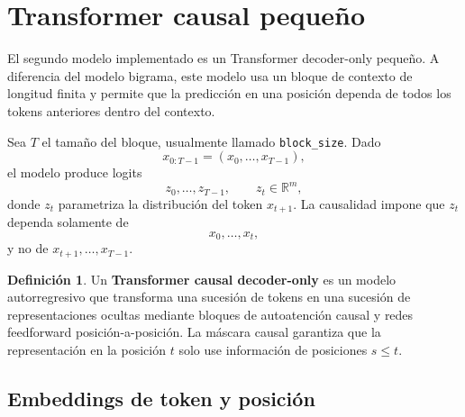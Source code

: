 \documentclass[11pt]{report}
\newenvironment{tcolorbox}[1][]{\par\medskip\noindent\ignorespaces}{\par\medskip}
\theoremstyle{definition}
\newtheorem{definicion}{Definición}[section]
\theoremstyle{plain}
\numberwithin{equation}{section}
\begin{document}
\section{Transformer causal pequeño}

El segundo modelo implementado es un Transformer decoder-only pequeño. A diferencia del modelo bigrama, este modelo usa un bloque de contexto de longitud finita y permite que la predicción en una posición dependa de todos los tokens anteriores dentro del contexto.

Sea \(T\) el tamaño del bloque, usualmente llamado \texttt{block\_size}. Dado
\begin{equation*}
    x_{0:T-1}
    =
    (x_0,\ldots,x_{T-1}),
\end{equation*}
el modelo produce logits
\begin{equation*}
    z_0,\ldots,z_{T-1},
    \qquad
    z_t\in\mathbb{R}^m,
\end{equation*}
donde \(z_t\) parametriza la distribución del token \(x_{t+1}\). La causalidad impone que \(z_t\) dependa solamente de
\begin{equation*}
    x_0,\ldots,x_t,
\end{equation*}
y no de \(x_{t+1},\ldots,x_{T-1}\).

\begin{tcolorbox}[colback=blue!8, colframe=blue!8, boxrule=0pt]
\begin{definicion}
Un \textbf{Transformer causal decoder-only} es un modelo autorregresivo que transforma una sucesión de tokens en una sucesión de representaciones ocultas mediante bloques de autoatención causal y redes feedforward posición-a-posición. La máscara causal garantiza que la representación en la posición \(t\) solo use información de posiciones \(s\leq t\).
\end{definicion}
\end{tcolorbox}

\subsection{Embeddings de token y posición}
\end{document}
